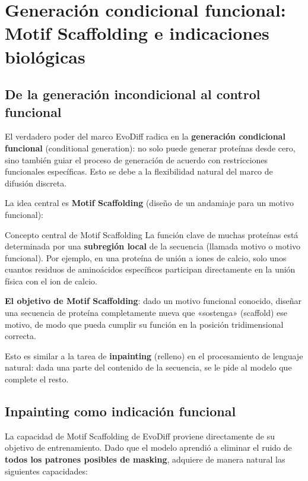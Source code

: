 \section{Generación condicional funcional: Motif Scaffolding e indicaciones biológicas}

\subsection{De la generación incondicional al control funcional}

El verdadero poder del marco EvoDiff radica en la \textbf{generación condicional funcional} (conditional generation): no solo puede generar proteínas desde cero, sino también guiar el proceso de generación de acuerdo con restricciones funcionales específicas. Esto se debe a la flexibilidad natural del marco de difusión discreta.

La idea central es \textbf{Motif Scaffolding} (diseño de un andamiaje para un motivo funcional):

\begin{importantbox}{Concepto central de Motif Scaffolding}
La función clave de muchas proteínas está determinada por una \textbf{subregión local} de la secuencia (llamada motivo o motivo funcional). Por ejemplo, en una proteína de unión a iones de calcio, solo unos cuantos residuos de aminoácidos específicos participan directamente en la unión física con el ion de calcio.

\textbf{El objetivo de Motif Scaffolding}: dado un motivo funcional conocido, diseñar una secuencia de proteína completamente nueva que «sostenga» (scaffold) ese motivo, de modo que pueda cumplir su función en la posición tridimensional correcta.

Esto es similar a la tarea de \textbf{inpainting} (relleno) en el procesamiento de lenguaje natural: dada una parte del contenido de la secuencia, se le pide al modelo que complete el resto.
\end{importantbox}

\subsection{Inpainting como indicación funcional}

La capacidad de Motif Scaffolding de EvoDiff proviene directamente de su objetivo de entrenamiento. Dado que el modelo aprendió a eliminar el ruido de \textbf{todos los patrones posibles de masking}, adquiere de manera natural las siguientes capacidades:

